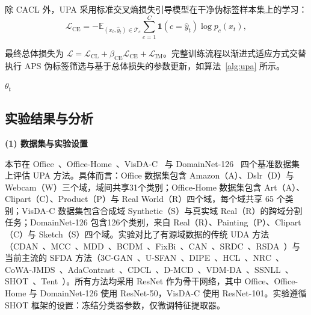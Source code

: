 除 CACL 外，UPA 采用标准交叉熵损失引导模型在干净伪标签样本集上的学习：
\begin{equation}
\mathcal{L}_{\text{CE}} = -\mathbb{E}_{(x_t, \hat{y}_t) \in \mathcal{T}_c} \sum_{c=1}^{C} \mathbf{1}(c = \hat{y}_t) \log p_c(x_t),
\label{eq:ce_loss}
\end{equation}

最终总体损失为 $\mathcal{L} = \mathcal{L}_{\text{CL}} + \beta_{\text{CE}} \mathcal{L}_{\text{CE}} + \mathcal{L}_{\text{IM}}$。完整训练流程以渐进式适应方式交替执行 APS 伪标签筛选与基于总体损失的参数更新，如算法~\ref{alg:upa} 所示。

\begin{algorithm}[!htb]
  \label{alg:upa} 
  \small
  \BlankLine
  \Return $\theta_t$
\end{algorithm}

\subsection{实验结果与分析}

\noindent\textbf{(1) 数据集与实验设置}

本节在 Office~\cite{saenko2010adapting}、Office-Home~\cite{venkateswara2017deep}、VisDA-C~\cite{peng2017visda} 与 DomainNet-126~\cite{peng2019moment} 四个基准数据集上评估 UPA 方法。具体而言：Office 数据集包含 Amazon（A）、Dslr（D）与 Webcam（W）三个域，域间共享31个类别；Office-Home 数据集包含 Art（A）、Clipart（C）、Product（P）与 Real World（R）四个域，每个域共享 65 个类别；VisDA-C 数据集包含合成域 Synthetic（S）与真实域 Real（R）的跨域分割任务；DomainNet-126 包含126个类别，来自 Real（R）、Painting（P）、Clipart（C）与 Sketch（S）四个域。实验对比了有源域数据的传统 UDA 方法（CDAN~\cite{CDAN}、MCC~\cite{MCC}、MDD~\cite{MDD}、BCDM~\cite{BCDM}、FixBi~\cite{FIxBi}、CAN~\cite{CAN}、SRDC~\cite{SRDC}、RSDA~\cite{RSDA}）与当前主流的 SFDA 方法（3C-GAN~\cite{3C-GAN}、U-SFAN~\cite{U-SFAN}、DIPE~\cite{DIPE}、HCL~\cite{HCL}、NRC~\cite{yang2021neighbor}、CoWA-JMDS~\cite{cowa}、AdaContrast~\cite{AdaContrast}、CDCL~\cite{wang2022cross}、D-MCD~\cite{chu2022denoised}、VDM-DA~\cite{tian2022vdm}、SSNLL~\cite{chen2022self}、SHOT~\cite{liang2021source}、Tent~\cite{tent}）。所有方法均采用 ResNet 作为骨干网络，其中 Office、Office-Home 与 DomainNet-126 使用 ResNet-50，VisDA-C 使用 ResNet-101。实验遵循 SHOT 框架的设置：冻结分类器参数，仅微调特征提取器。


